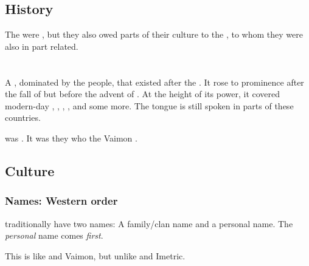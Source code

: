 \subsection{History}
The \Shurco{} were \Mekrii, but they also owed parts of their culture to the  \Masthenon, to whom they were also in part related. 















\section{\Tepharae}
A , dominated by the  people, that existed after the . 
It rose to prominence after the fall of  but before the advent of . 
At the height of its power, it covered modern-day , , , ,  and some more. 
The \Tepharin{} tongue is still spoken in parts of these countries. 

\Tepharae{} was . 
It was they who  the Vaimon . 









\subsection{Culture}
\subsubsection{Names: Western order}
\Ortaican{} traditionally have two names: 
A family/clan name and a personal name. 
The \emph{personal} name comes \emph{first}. 

This is like \Velcadian{} and Vaimon, but unlike \Ortaican{} and Imetric. 









